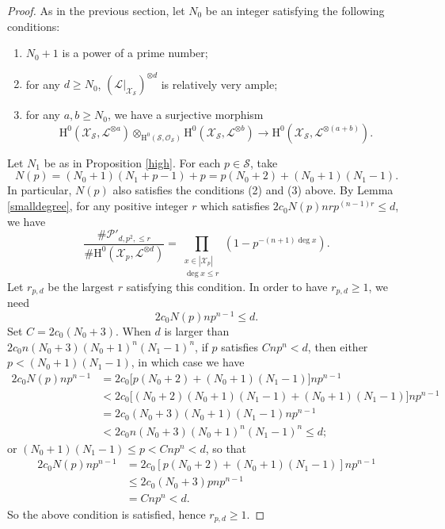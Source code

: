\documentclass[JEP,XML,SOM,Unicode,published]{cedram}
\theoremstyle{plain}
\theoremstyle{definition}
\newcommand{\ho}{\mathrm{H}}
\newcommand{\X}{\mathcal{X}}
\newcommand{\li}{\mathcal{L}}
\begin{document}
\begin{proof}
As in the previous section, let $N_0$ be an integer satisfying the following conditions:
\begin{enumerate}
\item $N_0+1$ is a power of a prime number;
\item for any $d\geq N_0$, $(\li|_{\X_\mathcal{S}})^{\otimes d}$ is relatively very ample;
\item for any $a,b\geq N_0$, we have a surjective morphism
\[
\ho^0(\X_{\mathcal{S}}, \li^{\otimes a}) \otimes_{\ho^0(\mathcal{S}, \mathcal{O}_{\mathcal{S}})}\ho^0(\X_{\mathcal{S}}, \li^{\otimes b})\to \ho^0(\X_{\mathcal{S}}, \li^{\otimes (a+b)}).
\]
\end{enumerate}

Let $N_1$ be as in Proposition \ref{high}.
For each $p\in \mathcal{S}$, take
\[
N(p)=(N_0+1)(N_1+p-1)+p=p(N_0+2)+(N_0+1)(N_1-1).
\]
In particular, $N(p)$ also satisfies the conditions (2) and (3) above.
By Lemma \ref{smalldegree}, for any positive integer $r$ which satisfies $2c_0N(p)nrp^{(n-1)r}\leq d$, we have
\[
\frac{\#\mathcal{P}'_{d,p^2,\leq r}}{\#\ho^0(\X_{p}, \li^{\otimes d})}=\prod_{\substack{x\in |\X_{p}|\\ \deg x\leq r}} \left(1-p^{-(n+1)\deg x} \right).
\]
Let $r_{p,d}$ be the largest $r$ satisfying this condition. In order to have $r_{p,d}\geq 1$, we need
\[
2c_0N(p)np^{n-1}\leq d.
\]
Set $C=2c_0(N_0+3)$. When $d$ is larger than $2c_0n(N_0+3)(N_0+1)^n(N_1-1)^n$, if $p$ satisfies $Cnp^n<d$, then either $p<(N_0+1)(N_1-1)$, in which case we have
\begin{align*}
2c_0N(p)np^{n-1} &= 2c_0\Big[ p(N_0+2)+(N_0+1)(N_1-1)\Big]np^{n-1} \\
&<2c_0\Big[ (N_0+2)(N_0+1)(N_1-1)+(N_0+1)(N_1-1)\Big]np^{n-1}\\
&=2c_0(N_0+3)(N_0+1)(N_1-1)np^{n-1}\\
&<2c_0n(N_0+3)(N_0+1)^n(N_1-1)^n\leq d;
\end{align*}
or $(N_0+1)(N_1-1)\leq p <Cnp^n<d$, so that
\begin{align*}
2c_0N(p)np^{n-1}&= 2c_0[p(N_0+2)+(N_0+1)(N_1-1)]np^{n-1} \\
&\leq 2c_0(N_0+3)pnp^{n-1}\\
&=Cnp^n<d.
\end{align*}
So the above condition is satisfied, hence $r_{p,d}\geq 1$.


\end{proof}
\end{document}
